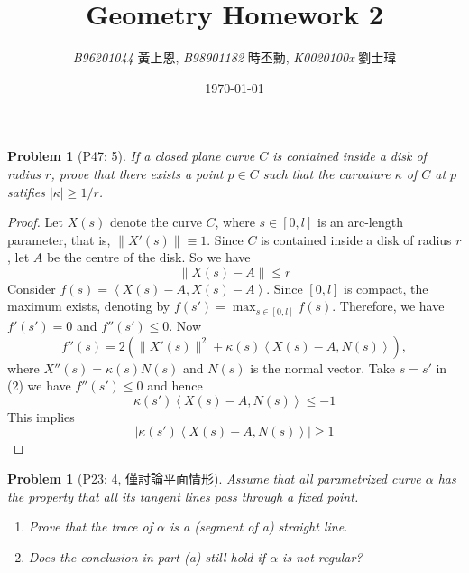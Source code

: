 \documentclass[10pt,a4paper]{article}
\newcommand{\LiHei}{\CJKfamily{lh}}
\newcounter{theProblemCounter}
\newtheorem{problem}[theProblemCounter]{Problem}
\begin{document}
\title{{Geometry Homework 2}}
\author{{\it{B96201044}} {\LiHei 黃上恩}, {\it{B98901182}} {\LiHei 時丕勳}, {\it{K0020100x}} {\LiHei 劉士瑋}}
\date{\today}
\maketitle

\setcounter{theProblemCounter}{2}
\begin{problem}[P47: 5]
If a closed plane curve $C$ is contained inside a disk of radius $r$, prove that there exists a point $p\in C$ such that the curvature $\kappa$ of $C$ at $p$ satifies $|\kappa|\ge 1/r$.
\end{problem}
\begin{proof}
Let $X(s)$ denote the curve $C$, where $s\in [0, l]$ is an arc-length parameter, that is, $\|X'(s)\|\equiv 1$. Since $C$ is contained inside a disk of radius $r$, let $A$ be the centre of the disk. So we have
\begin{equation} \|X(s)-A\|\le r\end{equation}
Consider $f(s)=\left\langle X(s)-A, X(s)-A\right\rangle$. Since $[0, l]$ is compact, the maximum exists, denoting by $f(s') = \max_{s\in[0,l]}f(s)$. Therefore, we have $f'(s')=0$ and $f''(s') \le 0$. Now 
\begin{equation}
	f''(s)=2\left(\|X'(s)\|^2+\kappa(s)\left\langle X(s)-A, N(s)\right\rangle\right),
\end{equation}
where $X''(s)=\kappa(s)N(s)$ and $N(s)$ is the normal vector. Take $s=s'$ in (2) we have $f''(s') \le 0$ and hence
\begin{equation}
\kappa(s')\left\langle X(s)-A, N(s)\right\rangle \le -1
\end{equation}
This implies
\begin{equation}
|\kappa(s')\left\langle X(s)-A, N(s)\right\rangle| \ge 1
\end{equation}
\end{proof}

\setcounter{theProblemCounter}{3}
\begin{problem}[P23: 4, 僅討論平面情形]
Assume that all parametrized curve $\alpha$ has the property that all its tangent lines pass through a fixed point.
\begin{enumerate}
\item[(a)] Prove that the trace of $\alpha$ is a (segment of a) straight line.
\item[(b)] Does the conclusion in part (a) still hold if $\alpha$ is not regular?
\end{enumerate}
\end{problem}
\end{document}
